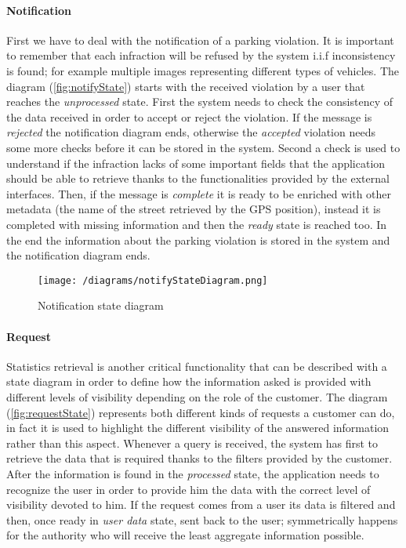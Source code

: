 	\paragraph{Notification}
		First we have to deal with the notification of a parking violation. It is important to remember that each infraction will be refused by the system i.i.f inconsistency is found; for example multiple images representing different types of vehicles.
		The diagram (\autoref{fig:notifyState}) starts with the received violation by a user that reaches the \textit{unprocessed} state. First the system needs to check the consistency of the data received in order to accept or reject the violation. If the message is \textit{rejected} the notification diagram ends, otherwise the \textit{accepted} violation needs some more checks before it can be stored in the system. Second a check is used to understand if the infraction lacks of some important fields that the application should be able to retrieve thanks to the functionalities provided by the external interfaces. Then, if the message is \textit{complete} it is ready to be enriched with other metadata (the name of the street retrieved by the GPS position), instead it is completed with missing information and then the \textit{ready} state is reached too. In the end the information about the parking violation is stored in the system and the notification diagram ends.
		
		\begin{figure}[h]
			\centering
			\texttt{[image: /diagrams/notifyStateDiagram.png]}
			\caption{\label{fig:notifyState}Notification state diagram}
		\end{figure}
	
	\paragraph{Request}
		Statistics retrieval is another critical functionality that can be described with a state diagram in order to define how the information asked is provided with different levels of visibility depending on the role of the customer.
		The diagram (\autoref{fig:requestState}) represents both different kinds of requests a customer can do, in fact it is used to highlight the different visibility of the answered information rather than this aspect. Whenever a query is received, the system has first to retrieve the data that is required thanks to the filters provided by the customer. After the information is found in the \textit{processed} state, the application needs to recognize the user in order to provide him the data with the correct level of visibility devoted to him. If the request comes from a user its data is filtered and then, once ready in \textit{user data} state, sent back to the user; symmetrically happens for the authority who will receive the least aggregate information possible. 
		
